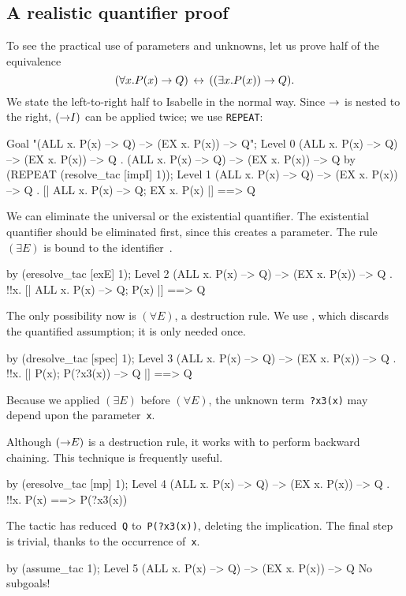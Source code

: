 \subsection{A realistic quantifier proof}
To see the practical use of parameters and unknowns, let us prove half of
the equivalence 
\[ (\forall x. P(x) \rightarrow Q) \,\leftrightarrow\, ((\exists x. P(x)) \rightarrow Q). \]
We state the left-to-right half to Isabelle in the normal way.
Since $\rightarrow$ is nested to the right, $({\rightarrow}I)$ can be applied twice; we
use \texttt{REPEAT}:
\begin{ttbox}
Goal "(ALL x. P(x) --> Q) --> (EX x. P(x)) --> Q";
{\out Level 0}
{\out (ALL x. P(x) --> Q) --> (EX x. P(x)) --> Q}
{. (ALL x. P(x) --> Q) --> (EX x. P(x)) --> Q}
\ttbreak
by (REPEAT (resolve_tac [impI] 1));
{\out Level 1}
{\out (ALL x. P(x) --> Q) --> (EX x. P(x)) --> Q}
{. [| ALL x. P(x) --> Q; EX x. P(x) |] ==> Q}
\end{ttbox}
We can eliminate the universal or the existential quantifier.  The
existential quantifier should be eliminated first, since this creates a
parameter.  The rule~$(\exists E)$ is bound to the
identifier~.
\begin{ttbox}
by (eresolve_tac [exE] 1);
{\out Level 2}
{\out (ALL x. P(x) --> Q) --> (EX x. P(x)) --> Q}
{. !!x. [| ALL x. P(x) --> Q; P(x) |] ==> Q}
\end{ttbox}
The only possibility now is $(\forall E)$, a destruction rule.  We use 
, which discards the quantified assumption; it is
only needed once.
\begin{ttbox}
by (dresolve_tac [spec] 1);
{\out Level 3}
{\out (ALL x. P(x) --> Q) --> (EX x. P(x)) --> Q}
{. !!x. [| P(x); P(?x3(x)) --> Q |] ==> Q}
\end{ttbox}
Because we applied $(\exists E)$ before $(\forall E)$, the unknown
term~{\tt?x3(x)} may depend upon the parameter~\texttt{x}.

Although $({\rightarrow}E)$ is a destruction rule, it works with 
 to perform backward chaining.  This technique is
frequently useful.  
\begin{ttbox}
by (eresolve_tac [mp] 1);
{\out Level 4}
{\out (ALL x. P(x) --> Q) --> (EX x. P(x)) --> Q}
{. !!x. P(x) ==> P(?x3(x))}
\end{ttbox}
The tactic has reduced~\texttt{Q} to~\texttt{P(?x3(x))}, deleting the
implication.  The final step is trivial, thanks to the occurrence of~\texttt{x}.
\begin{ttbox}
by (assume_tac 1);
{\out Level 5}
{\out (ALL x. P(x) --> Q) --> (EX x. P(x)) --> Q}
{\out No subgoals!}
\end{ttbox}


